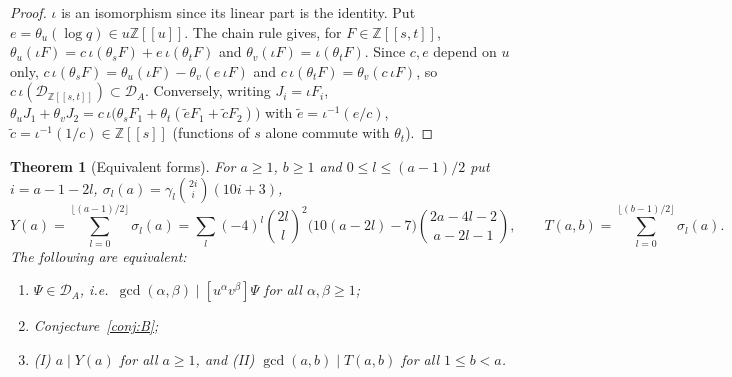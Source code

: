 \documentclass[11pt]{amsart}
\newtheorem{theorem}{Theorem}[section]
\theoremstyle{definition}
\newcommand{\Z}{\mathbb{Z}}
\newcommand{\Der}{\mathcal{D}}
\begin{document}
\begin{proof}
$\iota$ is an isomorphism since its linear part is the identity. Put $e=\theta_u(\log q)\in u\Z[[u]]$.
The chain rule gives, for $F\in\Z[[s,t]]$,
$\theta_u(\iota F)=c\,\iota(\theta_sF)+e\,\iota(\theta_tF)$ and $\theta_v(\iota F)=\iota(\theta_tF)$.
Since $c,e$ depend on $u$ only, $c\,\iota(\theta_sF)=\theta_u(\iota F)-\theta_v(e\,\iota F)$ and
$c\,\iota(\theta_tF)=\theta_v(c\,\iota F)$, so $c\,\iota(\Der_{\Z[[s,t]]})\subset\Der_A$. Conversely,
writing $J_i=\iota F_i$,
$\theta_uJ_1+\theta_vJ_2=c\,\iota\big(\theta_sF_1+\theta_t(\tilde e F_1+\tilde c F_2)\big)$ with
$\tilde e=\iota^{-1}(e/c)$, $\tilde c=\iota^{-1}(1/c)\in\Z[[s]]$ (functions of $s$ alone commute
with $\theta_t$).
\end{proof}

\begin{theorem}[Equivalent forms]\label{thm:equiv}
For $a\ge1$, $b\ge1$ and $0\le l\le(a-1)/2$ put $i=a-1-2l$,
$\sigma_l(a)=\gamma_l\binom{2i}i(10i+3)$,
\[
Y(a)=\sum_{l=0}^{\lfloor(a-1)/2\rfloor}\sigma_l(a)
 =\sum_{l}(-4)^l\binom{2l}l^2\big(10(a-2l)-7\big)\binom{2a-4l-2}{a-2l-1},\qquad
T(a,b)=\sum_{l=0}^{\lfloor(b-1)/2\rfloor}\sigma_l(a).
\]
The following are equivalent:
\begin{enumerate}[label=(\alph*)]
\item $\Psi\in\Der_A$, i.e.\ $\gcd(\alpha,\beta)\mid[u^\alpha v^\beta]\Psi$ for all $\alpha,\beta\ge1$;
\item Conjecture~\ref{conj:B};
\item \textup{(I)} $a\mid Y(a)$ for all $a\ge1$, and \textup{(II)} $\gcd(a,b)\mid T(a,b)$ for all
$1\le b<a$.
\end{enumerate}
\end{theorem}
\end{document}
